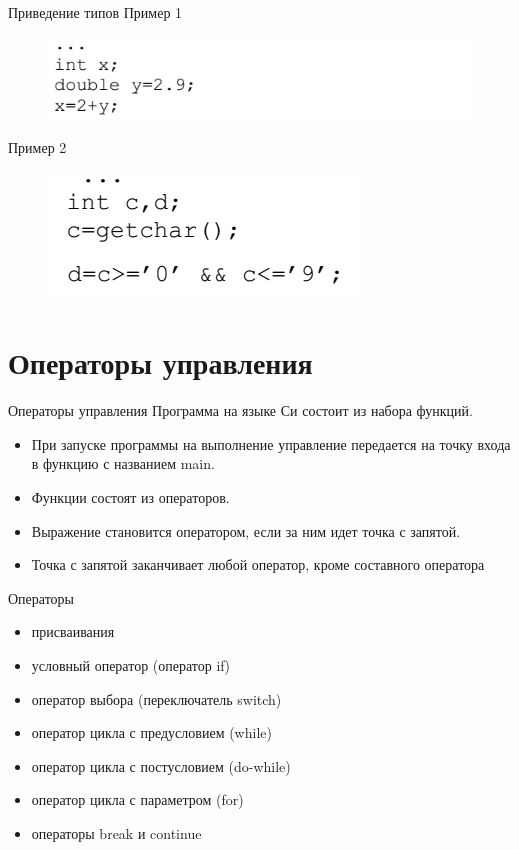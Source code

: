 \documentclass{beamer}
\begin{document}
\begin{frame}{Приведение типов}
Пример 1
\begin{figure}[h]
\centering
\includegraphics[scale=0.5]{images/lec02-pic05.png}
\end{figure}
Пример 2
\begin{figure}[h]
\centering
\includegraphics[scale=0.5]{images/lec02-pic06.png}
\end{figure}
\end{frame}

\section{Операторы управления}
\begin{frame}{Операторы управления}
Программа на языке Си состоит из набора функций.
\begin{itemize}
\item При запуске программы на выполнение управление передается на точку входа в функцию с названием main.
\item Функции состоят из операторов. 
\item Выражение становится оператором, если за ним идет точка с запятой. 
\item Точка с запятой заканчивает любой оператор, кроме составного оператора { }
\end{itemize}
\begin{block}{Операторы}
\begin{itemize}
\item присваивания
\item условный оператор (оператор if)
\item оператор выбора (переключатель switch)
\item оператор цикла с предусловием (while)
\item оператор цикла с постусловием (do-while)
\item оператор цикла с параметром (for)
\item операторы break и continue
\end{itemize}
\end{block}
\end{frame} 
\end{document}
